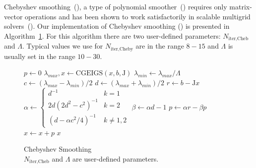 Chebyshev smoothing~(\cite{li2011chebyshev}), a type of polynomial
smoother~(\cite{saad2003iterative})
requires only matrix-vector operations and has been shown to work
satisfactorily in scalable multigrid
solvers~(\cite{ghysels2012improving}).  Our implementation of
Chebyshev smoothing (\cite{li2011chebyshev}) is presented in
Algorithm~\ref{alg:Chebyshev_Smoother}. For this algorithm there are two user-defined parameters: $N_\text{iter,Cheb}$ and $\Lambda$. Typical values we use for $N_\text{iter,Cheby}$ are in the range $8-15$ and $\Lambda$ is usually set in the range $10-30$.
%
%
\begin{figure}[ht!]
  \begin{algorithm}[H]
    \caption{Chebyshev Smoothing\\ $N_\text{iter,Cheb}$ and $\Lambda$ are user-defined parameters.
}\label{alg:Chebyshev_Smoother}
    \begin{algorithmic}[1]
      \State $p \leftarrow 0$
      \State  $\lambda_{max}, x \leftarrow \text{CGEIGS}(x,b,\mathrm{J})$
      \State $\lambda_{min} \leftarrow \lambda_{max}/\Lambda$
      \State $c \leftarrow (\lambda_{max} - \lambda_{min})/2$
      \State $d \leftarrow (\lambda_{max} + \lambda_{min})/2$
      \State $r \leftarrow b - \mathrm{J}x$
\State  $\alpha \leftarrow 
  \begin{cases}
  d^{-1} & k = 1\\
  2d(2d^2-c^2)^{-1} & k = 2\\
  (d - \alpha c^2/4)^{-1} & k \neq 1,2
  \end{cases}
  $\;
  \State $\beta \leftarrow \alpha d - 1$
  \State $p \leftarrow \alpha r - \beta p$
  \State $x \leftarrow x + p$
  \EndFor
  \State \Return $x$
      \EndFunction
    \end{algorithmic}
  \end{algorithm}
\end{figure}
